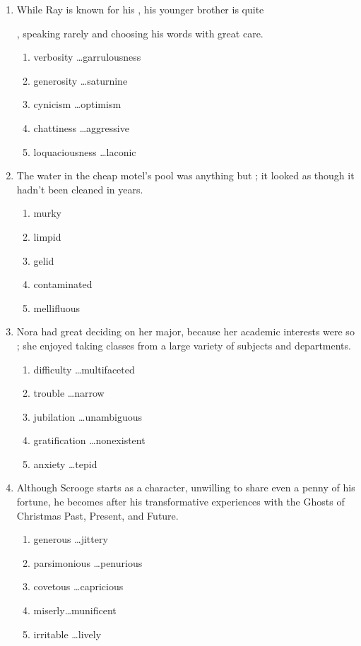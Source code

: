 \begin{enumerate}
\newpage
\item While Ray is known for his \longline, his younger brother is quite

\longline, speaking rarely and choosing his words with great care.

\begin{enumerate}[label=(\Alph*)]
\item verbosity \ldots garrulousness
\item generosity \ldots saturnine
\item cynicism \ldots optimism
\item chattiness \ldots aggressive
\item loquaciousness \ldots laconic
\end{enumerate}

\bigskip
\item The water in the cheap motel's pool was anything but \longline; it looked as though it hadn't been cleaned in years.
\begin{enumerate}[label=(\Alph*)]
\item murky
\item limpid
\item gelid
\item contaminated
\item mellifluous
\end{enumerate}

\bigskip
\item Nora had great \longline deciding on her major, because her academic interests were so \longline; she enjoyed taking classes from a large variety of subjects and departments.
\begin{enumerate}[label=(\Alph*)]
\item difficulty \ldots multifaceted
\item trouble \ldots narrow
\item jubilation \ldots unambiguous
\item gratification \ldots nonexistent
\item anxiety \ldots tepid
\end{enumerate}

\newpage
\item Although Scrooge starts as a \longline character, unwilling to share even a penny of his fortune, he becomes \longline after his transformative experiences with the Ghosts of Christmas Past, Present, and Future.
\begin{enumerate}[label=(\Alph*)]
\item generous \ldots jittery
\item parsimonious \ldots penurious
\item covetous \ldots capricious
\item miserly\ldots munificent
\item irritable \ldots lively
\end{enumerate}


\end{enumerate}
